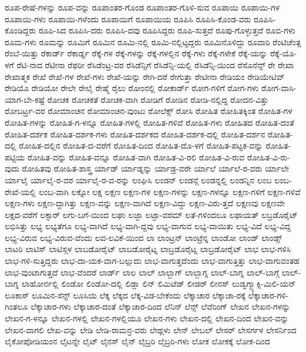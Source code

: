 {ರೂಪ-ರೇಷೆ-ಗಳನ್ನು
ರೂಪ-ವನ್ನು
ರೂಪಾಂತರ-ಗೊಂಡ
ರೂಪಾಂತರ-ಗೊಳಿ-ಸುವ
ರೂಪಾಯಿ
ರೂಪಾಯಿ-ಗಳ
ರೂಪಾಯಿ-ಗಳು
ರೂಪಾಯಿ-ಗಳೆಂದು
ರೂಪಾಯಿಗೆ
ರೂಪಾಯಿಯ
ರೂಪಿಸಿ
ರೂಪಿಸಿ-ಕೊಂಡ-ವರು
ರೂಪಿಸಿ-ಕೊಂಡಿದ್ದರು
ರೂಪಿ-ಸಿದ
ರೂಪಿಸಿ-ದರು
ರೂಪಿಸಿ-ದವು
ರೂಪಿಸಿದ್ದರು
ರೂಪಿ-ಸುತ್ತದೆ
ರೂಪು-ಗೊಳ್ಳುತ್ತದೆ
ರೂಬಿ-ಗಳು
ರೂಮ-ಗಳು
ರೂಮನ್ನು
ರೂಮಿಗೆ
ರೂಮಿನ
ರೂಮಿ-ನಲ್ಲಿ
ರೂಮಿ-ನಲ್ಲಿಟ್ಟದ್ದರು
ರೂಮಿನೊಳಿದ್ದು
ರೂವಾರಿ
ರೆಂಟಿಚೆಂತ್ಲ
ರೆಂಬೆ-ಯಿತ್ತು
ರೆಕಾರ್ಡ್
ರೆಕಾರ್ಡ್ನ
ರೆಕ್ಕೆ-ಗಳ
ರೆಕ್ಕೆ-ಗಳನ್ನು
ರೆಕ್ಕೆ-ಗಳಲ್ಲಿನ
ರೆಕ್ಕೆ-ಗಳು
ರೆಕ್ಕೆ-ಗಳೇಕೆ
ರೆಕ್ಕೆ-ಯನ್ನು
ರೆಕ್ಕೆ-ಯೊ-ಳಗೆ
ರೆಟಿ-ನಾದ
ರೆಟೀನಾ
ರೆಫರೀ
ರೆಸಿಡೆಂಟ್ರ-ವರ
ರೆಸಿಡೆನ್ಸಿಗೆ
ರೆಸಿಡೆನ್ಸಿ-ಯಲ್ಲಿ
ರೆಸಿಡೆನ್ಸಿ-ಯಿಂದ
ರೆಸೊನೆನ್ಸ್
ರೇ
ರೇಖಾ
ರೇಖಾತ್ಮಕ
ರೇಖೆ
ರೇಖೆ-ಗಳ
ರೇಖೆ-ಗಳು
ರೇಖೆ-ಯನ್ನು
ರೇಗಿ-ದರೆ
ರೇಗುತ್ತಾ
ರೇಟೀನಾ
ರೇಡಿಯಂ
ರೇಡಿಯೇಟಿವ್
ರೇಡಿಯೊ
ರೇಡಿಯೋ
ರೇಲೇ
ರೇಲೈ
ರೇಷ್ಮೆ
ರೈಲು
ರೋಂನಲ್ಲಿ
ರೋಕಾರ್ಡ್
ರೋಗ-ಗಳಿಗೆ
ರೋಗ-ಗಳು
ರೋಗ-ವಾಸಿ-ಯಾಗ-ಬೇ-ಕಷ್ಟೆ
ರೋಚಕ
ರೋಚಕತೆ
ರೋಚಕ-ವಾಗಿ
ರೋಡಿಗೆ
ರೋಡಿನ
ರೋಡಿ-ನಲ್ಲಿದ್ದ
ರೋದನ-ವಿತ್ತು
ರೋಬರ್ಟ್ರ-ವರ
ರೋಮಾಂಚನ
ರೋಮಾಂಚನ-ವುಂಟು
ರೋಲೆಕ್ಸ್
ರೋಸಿ
ರೋಹಿತ
ರೋಹಿತಕ್ಕಿಂತ
ರೋಹಿತ-ಗಳ
ರೋಹಿತ-ಗಳನ್ನು
ರೋಹಿತ-ಗ-ಳನ್ನೂ
ರೋಹಿತ-ಗಳಲ್ಲಿ
ರೋಹಿತ-ಗಳಿವೆ
ರೋಹಿತ-ಗಳು
ರೋಹಿತದ
ರೋಹಿತ-ದಂತೆ
ರೋಹಿತ-ದರ್ಶಕ
ರೋಹಿತ-ದರ್ಶಕ-ಗಳು
ರೋಹಿತ-ದರ್ಶಕದ
ರೋಹಿತ-ದರ್ಶಕ-ದಲ್ಲಿ
ರೋಹಿತ-ದರ್ಶನ
ರೋಹಿತ-ದಲ್ಲಿ
ರೋಹಿತ-ದಲ್ಲಿನ
ರೋಹಿತ-ದ-ವರೆಗೆ
ರೋಹಿತ-ದಿಂದ
ರೋಹಿತ-ದೊ-ಳಗೆ
ರೋಹಿತ-ಪಟ್ಟಕ-ವನ್ನು
ರೋಹಿತ-ಪಟ್ಟಿಯ
ರೋಹಿತ-ವನ್ನು
ರೋಹಿತ-ವನ್ನೂ
ರೋಹಿತ-ವಾಗಿ
ರೋಹಿತ-ವಿ-ರಲಿ
ರೋಹಿತ-ವಿ-ರುವ
ರೋಹಿತ-ವಿ-ರು-ವುದು
ರೋಹಿತವು
ರೋಹಿತ-ಶಾಸ್ತ್ರ
ರ್ಯಾಡ್
ರ್ಯಾಡ್ನನ್ನು
ರ್ಯಾಡ್ರ-ವರೇ
ರ್ಯಾಲೆ
ರ್ಯಾಲೆ-ರ-ವರು
ರ್ಯಾಲೇ
ರ್ಯಾಲೈ
ರ್ಯಾಲೈ-ರ-ವರ
ರ್ಯಾಲೈ-ರ-ವ-ರನ್ನು
ಲಂಘಿಸಿ
ಲಂಡನ್
ಲಂಡನ್ಗೆ
ಲಂಡನ್ನಲ್ಲಿ
ಲಂಡನ್ನಿನ
ಲಂಬ
ಲಂಬ-ರೇಖೆ-ಯಲ್ಲಿ
ಲಂಬ-ವಾಗಿ
ಲಕ್ನೋ
ಲಕ್ಷ
ಲಕ್ಷಣ
ಲಕ್ಷಣ-ಗಳ
ಲಕ್ಷಣ-ಗಳನ್ನು
ಲಕ್ಷಣ-ಗಳನ್ನೂ
ಲಕ್ಷಣ-ಗಳಿಗೆ
ಲಕ್ಷಣ-ಗಳಿವೆ
ಲಕ್ಷಣ-ಗಳು
ಲಕ್ಷಣ-ದ್ದಾಗಿತ್ತು
ಲಕ್ಷಣ-ವನ್ನು
ಲಕ್ಷಣ-ವಾಗಿದೆ
ಲಕ್ಷಣ-ವಿದ್ದು
ಲಕ್ಷಣ-ವಿರು-ತ್ತದೆ
ಲಕ್ಷಣವು
ಲಕ್ಷಣವೇ
ಲಕ್ಷದ-ವರೆಗೆ
ಲಕ್ಸಾರ್
ಲಗು-ಬಗೆ-ಯಿಂದ
ಲಘು
ಲಜ್ಜಾ
ಲಟ್ಟಾ-ವರಮ್
ಲತೆ-ಗಳಿಂದಲೂ
ಲಫಾಯತ್
ಲಬ್ರಡೊರೈಟ್
ಲಭಿಸಿತ್ತು
ಲಭ್ಯ
ಲಭ್ಯತೆಗೂ
ಲಭ್ಯ-ವಾಗಿದೆ
ಲಭ್ಯ-ವಾಗಿ-ದ್ದವು
ಲಭ್ಯ-ವಾಗುವ
ಲಭ್ಯ-ವಾಯಿತು
ಲಭ್ಯ-ವಿದೆ
ಲಭ್ಯ-ವಿದ್ದ
ಲಭ್ಯ-ವಿರುವ
ಲಭ್ಯ-ವಿರುವ-ವೆಂದು
ಲವ-ಲವಿಕೆ-ಯಿಂದ
ಲಾ
ಲಾಂಟ್ರನ್
ಲಾಂಟ್ರೆನ್ನ
ಲಾಂಡೋ
ಲಾಂಡ್
ಲಾಂಡ್ಸ್
ಲಾಟರಿ
ಲಾಟಿಸ್
ಲಾಟಿಸ್ಗಳ
ಲಾಬಡೋರೈಟ್
ಲಾಬಡೋರೈಟ್ನ
ಲಾಬ್ರಡೊರೈಟ್ನ
ಲಾಬ್ರಡೋರೈಟ್
ಲಾಭ
ಲಾಭ-ಗಳಿಸಿ
ಲಾಭ-ಗಳಿ-ಸುತ್ತಿದ್ದರು
ಲಾಭ-ದಾ-ಯಕ-ವಾಗ-ಬಲ್ಲುದು
ಲಾಭ-ವಾಗುತ್ತದೆಂದು
ಲಾಭ-ವಾಗುತ್ತಿತ್ತು
ಲಾಭ-ವಾಗುವಂತಹ
ಲಾಭ-ವುಂಟಾಗುತ್ತದೆ
ಲಾಭ-ವೆಂದರೆ
ಲಾರ್ಡ್
ಲಾಲ
ಲಾಲ್
ಲಾಲ್ಬಾಗ್
ಲಾಲ್ಬಾಗ್ನ
ಲಾಲ್-ಬಾಗ್ನ
ಲಾಲ್-ಬಾಗ್ಗೆ
ಲಾಲ್-ಬಾಗ್ನ
ಲಾಹೋರ್ನಲ್ಲಿ
ಲಿಂಡೋ
ಲಿಂಡೋ-ದಲ್ಲಿ
ಲಿಡ್ಲಾ
ಲಿನ್
ಲಿಮಿಟೆಡ್
ಲೀಡರ್
ಲೀನಸ್
ಲುಡ್ವಗ್ಮ್ಯಾಕ್ಸಿ-ಮಿಲಿ-ಯನ್
ಲೂಕಾಸ್
ಲೂಮಿನ-ಸೆನ್ಸ್
ಲೂಸಿಯ
ಲೆಕ್ಕ
ಲೆಕ್ಕದ
ಲೆಕ್ಕ-ವಿಡ-ಬೇಕೆಂದು
ಲೆಕ್ಕಾಚಾರ
ಲೆಕ್ಕಾಚಾ-ರಕ್ಕೆ
ಲೆಕ್ಕಾಚಾರ-ಗಳಿ-ಗಿಂತಲೂ
ಲೆಕ್ಕಾಚಾರ-ಗಳು
ಲೆಕ್ಕಾಚಾರ-ದಂತೆ
ಲೆಕ್ಕಾಚಾರ-ದಿಂದ
ಲೆನಿನ್
ಲೆನ್ಸ್
ಲೆವೆರಿಂಗ್
ಲೇಖನ
ಲೇಖನ-ಗಳನ್ನು
ಲೇಖನ-ಗ-ಳನ್ನೂ
ಲೇಖನ-ಗಳಲ್ಲಿ
ಲೇಖನ-ಗಳಲ್ಲಿಯೂ
ಲೇಖನ-ಗಳು
ಲೇಖನ-ದಲ್ಲಿ
ಲೇಖನ-ದಿಂದ
ಲೇಖನ-ವನ್ನು
ಲೇಖನ-ವಾಗಲಿ
ಲೇಖ-ವನ್ನು
ಲೇಡಿ
ಲೇಡಿ-ರಾಮನ್ರ-ವರು
ಲೇಥ್ಗಳು
ಲೇನ್
ಲೇಬಲ್
ಲೇಸರ್
ಲೇಸರ್ಗಳ
ಲೇಸರ್ನಿಂದ
ಲೈಕೋಪೋಡಿಯಂನ
ಲೈಟನ್ನೇ
ಲೈಟ್
ಲೈನಸ್
ಲೈನ್
ಲೈಬ್ರರಿ
ಲೈಬ್ರರಿ-ಗಳು
ಲೋಕ
ಲೋಕಕ್ಕೆ
ಲೋಕ-ದಿಂದ
}
